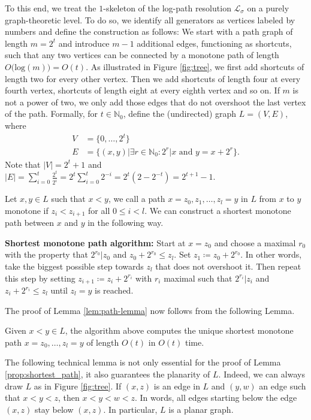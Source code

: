 \documentclass[a4paper,UKenglish,cleveref,nolineno,autoref]{socg-lipics-v2021}
\begin{document}
To this end, we treat the $1$-skeleton of the log-path resolution $\mathcal{L}_\sigma$ on a purely graph-theoretic level. To do so, we identify all generators as vertices labeled by numbers and define the construction as follows: We start with a path graph of length $m=2^t$ and introduce $m-1$ additional edges, functioning as shortcuts, such that any two vertices can be connected by a monotone path of length $O\big(\text{log}(m)\big)=O(t)$.
As illustrated in Figure \ref{fig:tree}, we first add shortcuts of length two for every other vertex. Then we add shortcuts of length four at every fourth vertex, shortcuts of length eight at every eighth vertex and so on. If $m$ is not a power of two, we only add those edges that do not overshoot the last vertex of the path. Formally, for $t\in \mathbb{N}_0$, define the (undirected) graph $L=(V,E)$, where
\begin{equation*}
\begin{aligned}
V&=\{0,\ldots,2^t\} \\ 
E&=\{(x,y)\vert\exists r\in\mathbb{N}_0\colon 2^r\vert x\text{ and } y=x+2^r\}.
\end{aligned}
\end{equation*}
Note that $\vert V\vert=2^t+1$ and $\vert E\vert=\sum_{i=0}^t \frac{2^t}{2^i}=2^t \sum_{i=0}^t 2^{-i}=2^t(2-2^{-t})=2^{t+1}-1$.

Let $x,y\in L$ such that $x<y$, we call a path $x=z_0,z_1,\ldots,z_l=y$ in $L$ from $x$ to $y$ monotone if $z_i<z_{i+1}$ for all $0\leq i<l$. We can construct a shortest monotone path between $x$ and $y$ in the following way.

\textbf{Shortest monotone path algorithm:} Start at $x=z_0$ and choose a maximal $r_0$ with the property that $2^{r_0}\vert z_0$ and $z_0+2^{r_0}\leq z_l$. Set $z_1\coloneqq z_0+2^{r_0}$. In other words, take the biggest possible step towards $z_l$ that does not overshoot it. Then repeat this step by setting $z_{i+1}\coloneqq z_i+2^{r_i}$ with $r_i$ maximal such that $2^{r_i}\vert z_i$ and $z_i+2^{r_i}\leq z_l$ until $z_l=y$ is reached. 

The proof of Lemma \ref{lem:path-lemma} now follows from the following Lemma.

\begin{lemma} \label{prop:shortest_path}
Given $x<y\in L$, the algorithm above computes the unique shortest monotone path $x=z_0,\ldots,z_l=y$ of length $O(t)$ in $O(t)$ time.
\end{lemma}

The following technical lemma is not only essential for the proof of Lemma \ref{prop:shortest_path}, it also guarantees the planarity of $L$. 
Indeed, we can always draw $L$ as in Figure \ref{fig:tree}. If $(x,z)$ is an edge in $L$ and $(y,w)$ an edge such that $x<y<z$, then $x<y<w<z$. In words, all edges starting below the edge $(x,z)$ stay below $(x,z)$. In particular, $L$ is a planar graph.
\end{document}
